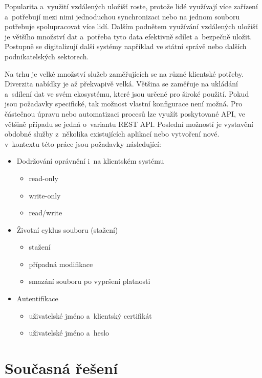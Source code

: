 Popularita a využití vzdálených uložišť roste, protože lidé využívají více zařízení a potřebují mezi nimi jednoduchou synchronizaci nebo na jednom souboru
potřebuje spolupracovat více lidí. Dalším podnětem využívání vzdálených uložišť je většího množství dat a potřeba tyto data efektivně sdílet a bezpečně uložit.
Postupně se digitalizují další systémy například ve státní správě nebo dalších podnikatelských sektorech. 

Na trhu je velké množství služeb zaměřujících se na různé klientské potřeby. Diverzita nabídky je až překvapivě velká. Většina se zaměřuje na ukládání a sdílení
dat ve svém ekosystému, které jsou určené pro široké použití. Pokud jsou požadavky specifické, tak možnost vlastní konfigurace není možná. Pro částečnou úpravu 
nebo automatizaci procesů lze využít poskytované API, ve většině případu se jedná o variantu REST API. Poslední možností je vystavění obdobné služby z několika
existujících aplikací nebo vytvoření nové.\\

\noindent v kontextu této práce jsou požadavky následující: 

\begin{itemize}
    \item Dodržování oprávnění i na klientském systému
    \begin{itemize}
        \item read-only
        \item write-only
        \item read/write
    \end{itemize}
    \item Životní cyklus souboru (stažení)
    \begin{itemize}
        \item stažení
        \item případná modifikace
        \item smazání souboru po vypršení platnosti
    \end{itemize}
    \item Autentifikace
    \begin{itemize}
        \item uživatelské jméno a klientský certifikát
        \item uživatelské jméno a heslo
    \end{itemize}
\end{itemize}

\section{Současná řešení}

